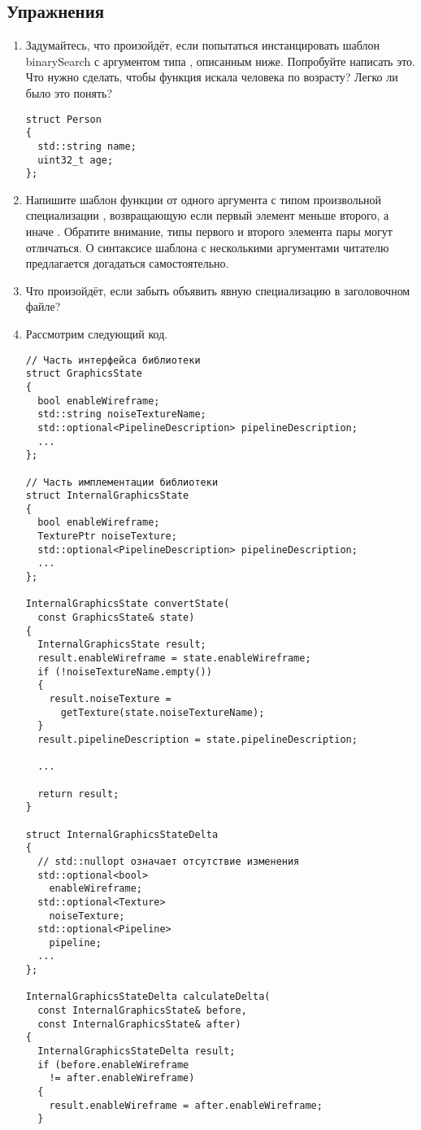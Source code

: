 \subsection*{Упражнения}
\begin{enumerate}
\item Задумайтесь, что произойдёт, если попытаться инстанцировать шаблон binarySearch с аргументом типа , описанным ниже.
Попробуйте написать это.
Что нужно сделать, чтобы функция искала человека по возрасту? Легко ли было это понять?
\begin{verbatim}
struct Person
{
  std::string name;
  uint32_t age;
};
\end{verbatim}
\item Напишите шаблон функции  от одного аргумента с типом произвольной специализации , возвращающую  если первый элемент меньше второго, а иначе .
Обратите внимание, типы первого и второго элемента пары могут отличаться.
О синтаксисе шаблона с несколькими аргументами читателю предлагается догадаться самостоятельно.
\item Что произойдёт, если забыть объявить явную специализацию в заголовочном файле?
\item Рассмотрим следующий код.
\begin{verbatim}
// Часть интерфейса библиотеки
struct GraphicsState
{
  bool enableWireframe;
  std::string noiseTextureName;
  std::optional<PipelineDescription> pipelineDescription;
  ...
};

// Часть имплементации библиотеки
struct InternalGraphicsState
{
  bool enableWireframe;
  TexturePtr noiseTexture;
  std::optional<PipelineDescription> pipelineDescription;
  ...
};

InternalGraphicsState convertState(
  const GraphicsState& state)
{
  InternalGraphicsState result;
  result.enableWireframe = state.enableWireframe;
  if (!noiseTextureName.empty())
  {
    result.noiseTexture =
      getTexture(state.noiseTextureName);
  }
  result.pipelineDescription = state.pipelineDescription;

  ...

  return result;
}

struct InternalGraphicsStateDelta
{
  // std::nullopt означает отсутствие изменения
  std::optional<bool>
    enableWireframe;
  std::optional<Texture>
    noiseTexture;
  std::optional<Pipeline>
    pipeline;
  ...
};

InternalGraphicsStateDelta calculateDelta(
  const InternalGraphicsState& before,
  const InternalGraphicsState& after)
{
  InternalGraphicsStateDelta result;
  if (before.enableWireframe
    != after.enableWireframe)
  {
    result.enableWireframe = after.enableWireframe;
  }


\end{verbatim}
\end{enumerate}

